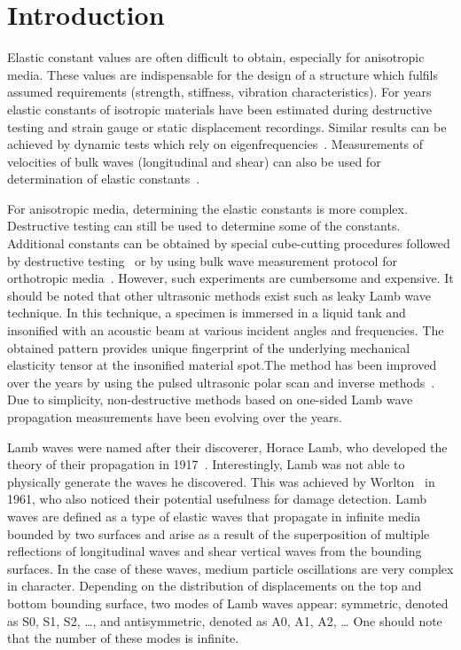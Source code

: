 \documentclass[preprint,12pt]{elsarticle}
\begin{document}

	\section{Introduction}
	Elastic constant values are often difficult to obtain, especially for anisotropic media. These values are indispensable for the design of a structure which fulfils assumed requirements (strength, stiffness, vibration characteristics). For years elastic constants of isotropic materials have been estimated during destructive testing and strain gauge or static displacement recordings. Similar results can be achieved by dynamic tests which rely on eigenfrequencies~\cite{Beluch2014}. Measurements of velocities of bulk waves (longitudinal and shear) can also be used for determination of elastic constants~\cite{Rose1999}.

	For anisotropic media, determining the elastic constants is more complex. Destructive testing can still be used to determine some of the constants. Additional constants can be obtained by special cube-cutting procedures followed by destructive testing~\cite{Rose1991} or by using bulk wave measurement protocol for orthotropic media~\cite{Rose1999}. However, such experiments are cumbersome and expensive.  It should be noted that other ultrasonic methods exist such as leaky Lamb wave technique. In this technique, a specimen is immersed in a liquid tank and insonified with an acoustic beam at various incident angles and frequencies. The obtained pattern provides unique fingerprint of the underlying mechanical elasticity tensor at the insonified material spot.The method has been improved over the years by using the pulsed ultrasonic polar scan and inverse methods~\cite{Kersemans2014}. Due to simplicity, non-destructive methods based on one-sided Lamb wave propagation measurements have been evolving over the years.

	Lamb waves were named after their discoverer, Horace Lamb, who developed the theory of their propagation in 1917~\cite{Lamb1917}. Interestingly, Lamb was not able to physically generate the waves he discovered. This was achieved by Worlton~\cite{Worlton1961} in 1961, who also noticed their potential usefulness for damage detection. Lamb waves are defined as a type of elastic waves that propagate in infinite media bounded by two surfaces and arise as a result of the superposition of multiple reflections of longitudinal waves and shear vertical waves from the bounding surfaces. In the case of these waves, medium particle oscillations are very complex in character. Depending on the distribution of displacements on the top and bottom bounding surface, two modes of Lamb waves appear: symmetric, denoted as S0, S1, S2, …, and antisymmetric, denoted as A0, A1, A2, … One should note that the number of these modes is infinite.
\end{document}
